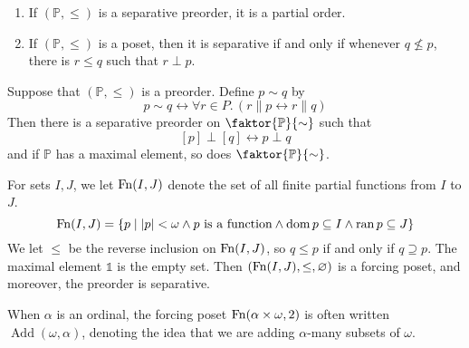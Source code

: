 \begin{proposition}
    \begin{enumerate}
        \item If \( (\mathbb P, \leq) \) is a separative preorder, it is a partial order.
        \item If \( (\mathbb P, \leq) \) is a poset, then it is separative if and only if whenever \( q \nleq p \), there is \( r \leq q \) such that \( r \perp p \).
    \end{enumerate}
\end{proposition}
\begin{proposition}
    Suppose that \( (\mathbb P, \leq) \) is a preorder.
    Define \( p \sim q \) by
    \[ p \sim q \leftrightarrow \forall r \in P.\, (r \mathrel\| p \leftrightarrow r \mathrel\| q) \]
    Then there is a separative preorder on \( \faktor{\mathbb P}{\sim} \) such that
    \[ [p] \perp [q] \leftrightarrow p \perp q \]
    and if \( \mathbb P \) has a maximal element, so does \( \faktor{\mathbb P}{\sim} \).
\end{proposition}
\begin{example}
    For sets \( I, J \), we let \( \operatorname{Fn}(I, J) \) denote the set of all finite partial functions from \( I \) to \( J \).
    \[ \operatorname{Fn}(I, J) = \qty{p \mid \abs{p} < \omega \wedge p \text{ is a function} \wedge \operatorname{dom}p \subseteq I \wedge \operatorname{ran}p \subseteq J} \]
    We let \( \leq \) be the reverse inclusion on \( \operatorname{Fn}(I, J) \), so \( q \leq p \) if and only if \( q \supseteq p \).
    The maximal element \( \Bbbone \) is the empty set.
    Then \( (\operatorname{Fn}(I, J), \leq, \varnothing) \) is a forcing poset, and moreover, the preorder is separative.
\end{example}
\begin{remark}
    When \( \alpha \) is an ordinal, the forcing poset \( \operatorname{Fn}(\alpha \times \omega, 2) \) is often written \( \operatorname{Add}(\omega, \alpha) \), denoting the idea that we are adding \( \alpha \)-many subsets of \( \omega \).
\end{remark}

